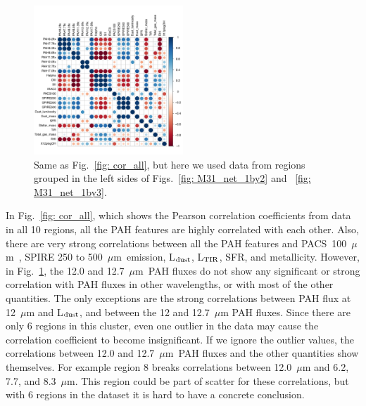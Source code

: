         \begin{figure}
        \includegraphics[width=0.5\textwidth]{../images0.01/cor_plots/M31_derived_3_to_8_core_plot_for_paper.pdf}%
        \caption{Same as Fig.~\ref{fig: cor_all}, but here we used data from regions grouped in the left sides of Figs.~\ref{fig: M31_net_1by2} and ~\ref{fig: M31_net_1by3}. }
          \label{fig: cor_cluster1}
        \end{figure}
        
        In Fig.~\ref{fig: cor_all}, which shows the Pearson correlation coefficients from data in all 10 regions, all the PAH features are highly correlated with each other. 
        Also, there are very strong correlations between all the PAH features and PACS~100~$\mu$m~, SPIRE 250 to 500~$\mu$m~emission, L$_{\rm dust}$, L$_{\rm TIR}$, SFR, and metallicity.
        However, in Fig.~\ref{fig: cor_cluster1}, the 12.0 and 12.7~$\mu$m~PAH fluxes do not show any significant or strong correlation with PAH fluxes in other wavelengths, or with most of the other quantities.
        The only exceptions are the strong correlations between PAH flux at 12~$\mu$m and L$_{\rm dust}$, and between the 12 and 12.7~$\mu$m PAH fluxes.
        Since there are only 6 regions in this cluster, even one outlier in the data may cause the correlation coefficient to become insignificant.
        If we ignore the outlier values, the correlations between 12.0 and 12.7~$\mu$m~PAH fluxes and the other quantities show themselves. 
        For example region 8 breaks correlations between 12.0~$\mu$m and 6.2, 7.7, and 8.3~$\mu$m.
        This region could be part of scatter for these correlations, but with 6 regions in the dataset it is hard to have a concrete conclusion.
        
